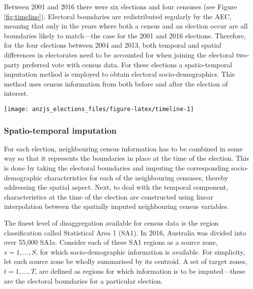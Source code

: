 \documentclass[
  times, doublespace]{anzsauth}
\let\origfigure\figure
\let\endorigfigure\endfigure
\renewenvironment{figure}[1][2] {
    \expandafter\origfigure\expandafter[htbp]
} {
    \endorigfigure
}
\begin{document}
Between 2001 and 2016 there were six elections and four censuses (see Figure \ref{fig:timeline}). Electoral boundaries are redistributed regularly by the AEC, meaning that only in the years where both a census and an election occur are all boundaries likely to match---the case for the 2001 and 2016 elections. Therefore, for the four elections between 2004 and 2013, both temporal and spatial differences in electorates need to be accounted for when joining the electoral two-party preferred vote with census data. For these elections a spatio-temporal imputation method is employed to obtain electoral socio-demographics. This method uses census information from both before and after the election of interest.

\begin{figure}[h]

{\centering \texttt{[image: anzjs\_elections\_files/figure-latex/timeline-1]} 

}

\caption{Timeline of Australian elections and censuses. They do not always occur in the same year.}\label{fig:timeline}
\end{figure}

\hypertarget{spatio-temporal-imputation}{%
\subsubsection*{Spatio-temporal imputation}\label{spatio-temporal-imputation}}

For each election, neighbouring census information has to be combined in some way so that it represents the boundaries in place at the time of the election. This is done by taking the electoral boundaries and imputing the corresponding socio-demographic characteristics for each of the neighbouring censuses, thereby addressing the spatial aspect. Next, to deal with the temporal component, characteristics at the time of the election are constructed using linear interpolation between the spatially imputed neighbouring census variables.

The finest level of disaggregation available for census data is the region classification called Statistical Area 1 (SA1). In 2016, Australia was divided into over 55,000 SA1s. Consider each of these SA1 regions as a source zone, \(s = 1,\dots,S\), for which socio-demographic information is available. For simplicity, let each source zone be wholly summarised by its centroid. A set of target zones, \(t = 1,\dots,T\), are defined as regions for which information is to be imputed---these are the electoral boundaries for a particular election.
\end{document}
